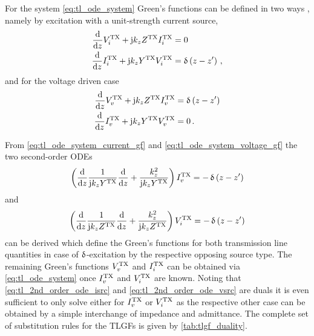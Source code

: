 For the system \eqref{eq:tl_ode_system} Green's functions can be defined in
two ways \cite{Michalski2016b}, namely by excitation with a unit-strength
current source,
\begin{subequations}\label{eq:tl_ode_system_current_gf}
	\begin{align}
		\frac{\mathrm{d}}{\mathrm{d} z}
		V_i^{\mathrm{TX}}
		+
		\mathrm{j}
		k_z
		Z^{\mathrm{TX}}
		I_i^{\mathrm{TX}}
		&= 0
		\\
		\frac{\mathrm{d}}{\mathrm{d} z}
		I_i^{\mathrm{TX}}
		+
		\mathrm{j}
		k_z
		Y^{\mathrm{TX}}
		V_i^{\mathrm{TX}}
		&= 
		\operatorname{\updelta}\left(z - z^\prime\right)
		\, ,
	\end{align}
\end{subequations}
and for the voltage driven case
\begin{subequations}\label{eq:tl_ode_system_voltage_gf}
	\begin{align}
		\frac{\mathrm{d}}{\mathrm{d} z}
		V_v^{\mathrm{TX}}
		+
		\mathrm{j}
		k_z
		Z^{\mathrm{TX}}
		I_v^{\mathrm{TX}}
		&=
		\operatorname{\updelta}\left(z - z^\prime\right)
		\\
		\frac{\mathrm{d}}{\mathrm{d} z}
		I_v^{\mathrm{TX}}
		+
		\mathrm{j}
		k_z
		Y^{\mathrm{TX}}
		V_v^{\mathrm{TX}}
		&= 
		0
		\, .
	\end{align}
\end{subequations}

From \eqref{eq:tl_ode_system_current_gf} and \eqref{eq:tl_ode_system_voltage_gf}
the two second-order \acp{ODE}
\begin{equation}\label{eq:tl_2nd_order_ode_vsrc}
	\left(
		\frac{\mathrm{d}}{\mathrm{d} z}
		\frac{1}{\mathrm{j} k_z Y^{\mathrm{TX}}}
		\frac{\mathrm{d}}{\mathrm{d} z} +
		\frac{k_z^2}{\mathrm{j} k_z Y^{\mathrm{TX}}}
	\right)
	I_v^{\mathrm{TX}}
	=
	-\operatorname{\updelta} \left(z - z^\prime\right)
\end{equation}
and
\begin{equation}\label{eq:tl_2nd_order_ode_isrc}
	\left(
		\frac{\mathrm{d}}{\mathrm{d} z}
		\frac{1}{\mathrm{j} k_z Z^{\mathrm{TX}}}
		\frac{\mathrm{d}}{\mathrm{d} z} +
		\frac{k_z^2}{\mathrm{j} k_z Z^{\mathrm{TX}}}
	\right)
	V_i^{\mathrm{TX}}
	=
	-\operatorname{\updelta} \left(z - z^\prime\right)
\end{equation}
can be derived which define the Green's functions for both transmission line
quantities in case of $\operatorname{\updelta}$-excitation by the respective opposing
source type.
The remaining Green's functions $V_v^{\mathrm{TX}}$ and $I_i^{\mathrm{TX}}$ can be obtained via
\eqref{eq:tl_ode_system} once $I_v^{\mathrm{TX}}$ and $V_i^{\mathrm{TX}}$ are known.
Noting that \eqref{eq:tl_2nd_order_ode_isrc} and
\eqref{eq:tl_2nd_order_ode_vsrc}
are duals it is even sufficient to only solve either for $I_v^{\mathrm{TX}}$ or $V_i^{\mathrm{TX}}$
as the respective other case can be obtained by a simple interchange of
impedance and admittance.
The complete set of substitution rules for the \acp{TLGF} is given by
\cref{tab:tlgf_duality}.

